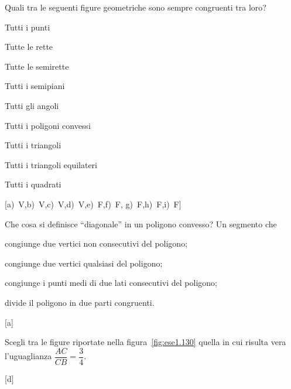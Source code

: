 \begin{esercizio}
\label{ese:1.128}
Quali tra le seguenti figure geometriche sono sempre congruenti tra 
loro?
\begin{multicols}{2}
\begin{enumeratea}
\item Tutti i punti                \hfill \boxV\quad\boxF
\item Tutte le rette               \hfill \boxV\quad\boxF
\item Tutte le semirette           \hfill \boxV\quad\boxF
\item Tutti i semipiani            \hfill \boxV\quad\boxF
\item Tutti gli angoli             \hfill \boxV\quad\boxF
\item Tutti i poligoni convessi    \hfill \boxV\quad\boxF
\item Tutti i triangoli            \hfill \boxV\quad\boxF
\item Tutti i triangoli equilateri \hfill \boxV\quad\boxF
\item Tutti i quadrati             \hfill \boxV\quad\boxF
\end{enumeratea}
\end{multicols}
\hfill[a)~V,\quad b)~V,\quad c)~V,\quad d)~V,\quad e)~F,\quad f)~F,\quad 
g)~F,\quad h)~F,\quad i)~F]
\end{esercizio}


\begin{esercizio}
\label{ese:1.129}
Che cosa si definisce ``diagonale'' in un poligono convesso? Un 
segmento che
\begin{enumeratea}
\item congiunge due vertici non consecutivi del poligono;
\item congiunge due vertici qualsiasi del poligono;
\item congiunge i punti medi di due lati consecutivi del poligono;
\item divide il poligono in due parti congruenti.
\end{enumeratea}
\vspace{-2em}
\hfill[a]
\end{esercizio}

	
\begin{esercizio}
\label{ese:1.130}
Scegli tra le figure riportate nella figura~\ref{fig:ese1.130} quella 
in cui risulta vera l'uguaglianza \(\dfrac{AC}{CB}=\dfrac{3}{4}\).
\begin{center}
\begin{inaccessibleblock}
 
\end{inaccessibleblock}
\end{center}
\vspace{-2.3em}
\hfill[d]
\end{esercizio}


